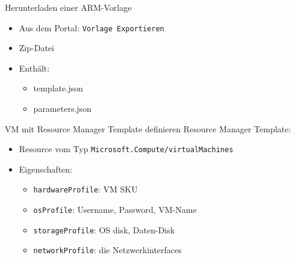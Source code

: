 \begin{flashcard}[Definition]{Herunterladen einer ARM-Vorlage}
    \begin{itemize}
        \item Aus dem Portal:\newline
            \texttt{Vorlage Exportieren}
        \item Zip-Datei
        \item Enthält:
            \begin{itemize}
                \item template.json
                \item parameters.json
            \end{itemize}
    \end{itemize}
\end{flashcard}


\begin{flashcard}[Definition]{VM mit Resource Manager Template definieren}
    Resource Manager Template:
    \begin{itemize}
        \item Resource vom Typ \texttt{Microsoft.Compute/virtualMachines}
        \item Eigenschaften:
            \begin{itemize}
                \item \texttt{hardwareProfile}: VM SKU
                \item \texttt{osProfile}: Username, Password, VM-Name
                \item \texttt{storageProfile}: OS disk, Daten-Disk
                \item \texttt{networkProfile}: die Netzwerkinterfaces
            \end{itemize}

    \end{itemize}
\end{flashcard}

